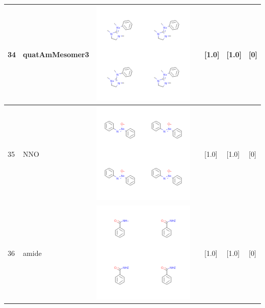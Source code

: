 \begin{longtable}{|l|l|l|l|l|l|l|}
34 & quatAmMesomer3 & \includegraphics[scale=0.6]{quatAmMesomer3CA.png} & & [1.0]& [1.0] & [0] \\
\hline
35 & NNO & \includegraphics[scale=0.6]{NNOCA.png} & & [1.0]& [1.0] & [0] \\
\hline
36 & amide & \includegraphics[scale=0.6]{amideCA.png} & & [1.0]& [1.0] & [0] \\

\end{longtable}
